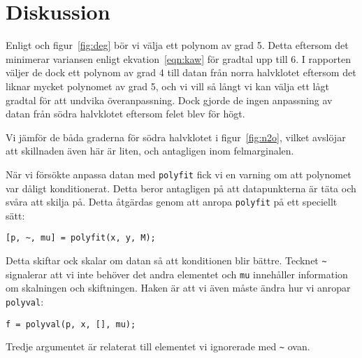 \section{Diskussion}
\label{sec:diskussion}

Enligt \cite{ref:kaw} och figur~\ref{fig:deg} bör vi välja ett polynom av grad 5. Detta eftersom det minimerar variansen enligt ekvation~\ref{eqn:kaw} för gradtal upp till 6. I rapporten väljer de dock ett polynom av grad 4 till datan från norra halvklotet eftersom det liknar mycket polynomet av grad 5, och vi vill så långt vi kan välja ett lågt gradtal för att undvika överanpassning. Dock gjorde de ingen anpassning av datan från södra halvklotet eftersom felet blev för högt.

Vi jämför de båda graderna för södra halvklotet i figur~\ref{fig:n2o}, vilket avslöjar att skillnaden även här är liten, och antagligen inom felmarginalen.

När vi försökte anpassa datan med \lstinline|polyfit| fick vi en varning om att polynomet var dåligt konditionerat. Detta beror antagligen på att datapunkterna är täta och svåra att skilja på. Detta åtgärdas genom att anropa \lstinline|polyfit| på ett speciellt sätt:
\begin{lstlisting}
[p, ~, mu] = polyfit(x, y, M);
\end{lstlisting}
Detta skiftar ock skalar om datan så att konditionen blir bättre. Tecknet \lstinline|~| signalerar att vi inte behöver det andra elementet och \lstinline|mu| innehåller information om skalningen och skiftningen. Haken är att vi även måste ändra hur vi anropar \lstinline|polyval|:
\begin{lstlisting}
f = polyval(p, x, [], mu);
\end{lstlisting}
Tredje argumentet är relaterat till elementet vi ignorerade med \lstinline|~| ovan.